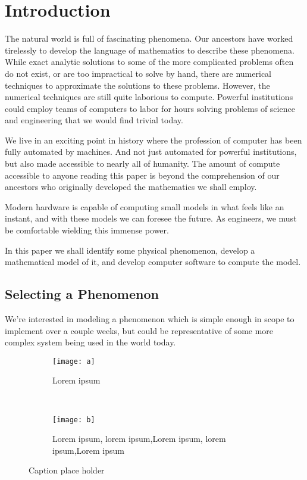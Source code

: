 \section{Introduction}

The natural world is full of fascinating phenomena. Our ancestors have worked tirelessly to develop the language of mathematics to describe these phenomena. While exact analytic solutions to some of the more complicated problems often do not exist, or are too impractical to solve by hand, there are numerical techniques to approximate the solutions to these problems. However, the numerical techniques are still quite laborious to compute. Powerful institutions could employ teams of computers to labor for hours solving problems of science and engineering that we would find trivial today. 

We live in an exciting point in history where the profession of computer has been fully automated by machines. And not just automated for powerful institutions, but also made accessible to nearly all of humanity. The amount of compute accessible to anyone reading this paper is beyond the comprehension of our ancestors who originally developed the mathematics we shall employ. 

Modern hardware is capable of computing small models in what feels like an instant, and with these models we can foresee the future. As engineers, we must be comfortable wielding this immense power. 

In this paper we shall identify some physical phenomenon, develop a mathematical model of it, and develop computer software to compute the model.

\subsection{Selecting a Phenomenon}

We're interested in modeling a phenomenon which is simple enough in scope to implement over a couple weeks, but could be representative of some more complex system being used in the world today. 

\begin{figure*}[t!]
    \centering
    \begin{subfigure}[t]{0.5\textwidth}
        \centering
        \texttt{[image: a]}
        \caption{Lorem ipsum}
    \end{subfigure}%
    ~ 
    \begin{subfigure}[t]{0.5\textwidth}
        \centering
        \texttt{[image: b]}
        \caption{Lorem ipsum, lorem ipsum,Lorem ipsum, lorem ipsum,Lorem ipsum}
    \end{subfigure}
    \caption{Caption place holder}
\end{figure*}

